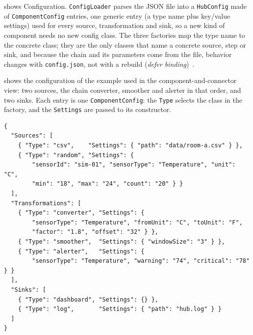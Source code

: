 \documentclass[../main-en.tex]{subfiles}
\begin{document}
 shows Configuration. \texttt{ConfigLoader}
parses the JSON file into a \texttt{HubConfig} made of
\texttt{ComponentConfig} entries, one generic entry (a type name plus
key/value settings) used for every source, transformation and sink, so a new
kind of component needs no new config class. The three factories map the
type name to the concrete class; they are the only classes that name a
concrete source, step or sink, and because the chain and its parameters come
from the file, behavior changes with \texttt{config.json}, not with a
rebuild (\emph{defer binding})~\cite{wiklund_ch8_nodate}.


 shows the configuration of the example used in the
component-and-connector view: two sources, the chain converter, smoother and
alerter in that order, and two sinks. Each entry is one
\texttt{ComponentConfig}: the \texttt{Type} selects the class in the factory,
and the \texttt{Settings} are passed to its constructor.

\begin{listing}[htbp]
\begin{verbatim}
{
  "Sources": [
    { "Type": "csv",    "Settings": { "path": "data/room-a.csv" } },
    { "Type": "random", "Settings": {
        "sensorId": "sim-01", "sensorType": "Temperature", "unit": "C",
        "min": "18", "max": "24", "count": "20" } }
  ],
  "Transformations": [
    { "Type": "converter", "Settings": {
        "sensorType": "Temperature", "fromUnit": "C", "toUnit": "F",
        "factor": "1.8", "offset": "32" } },
    { "Type": "smoother",  "Settings": { "windowSize": "3" } },
    { "Type": "alerter",   "Settings": {
        "sensorType": "Temperature", "warning": "74", "critical": "78" } }
  ],
  "Sinks": [
    { "Type": "dashboard", "Settings": {} },
    { "Type": "log",       "Settings": { "path": "hub.log" } }
  ]
}
\end{verbatim}
\caption{Example \texttt{config.json}: the sources, the transformation chain
in order (with the Celsius to Fahrenheit conversion) and the sinks.}
\label{lst:config}
\end{listing}
\end{document}
